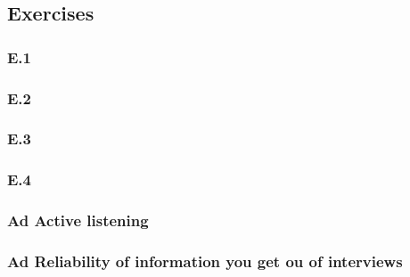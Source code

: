 \documentclass[]{article}
\begin{document}
\subsection*{Exercises} 

\subsubsection*{E.1}

\subsubsection*{E.2}

\subsubsection*{E.3}

\subsubsection*{E.4}

\subsubsection*{Ad Active listening}

\subsubsection*{Ad Reliability of information you get ou of interviews}


\printbibliography
\end{document}

